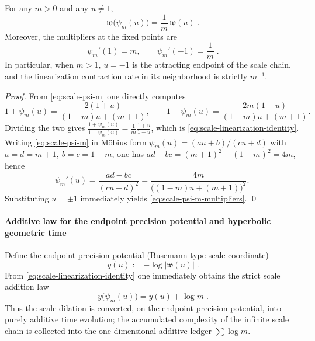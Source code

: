 \begin{proposition}\label{prop:scale-linearization-identity-multipliers}
For any \(m>0\) and any \(u\neq 1\),
\begin{equation}\label{eq:scale-linearization-identity}
\boxed{\;\mathfrak{w}\!\bigl(\psi_m(u)\bigr)=\frac{1}{m}\,\mathfrak{w}(u)\; }.
\end{equation}
Moreover, the multipliers at the fixed points are
\begin{equation}\label{eq:scale-psi-m-multipliers}
\boxed{\;\psi_m'(1)=m,\qquad \psi_m'(-1)=\frac{1}{m}\; }.
\end{equation}
In particular, when \(m>1\), \(u=-1\) is the attracting endpoint of the scale chain, and the linearization contraction rate in its neighborhood is strictly \(m^{-1}\).
\end{proposition}
\begin{proof}
From \eqref{eq:scale-psi-m} one directly computes
\[
1+\psi_m(u)=\frac{2(1+u)}{(1-m)u+(m+1)},
\qquad
1-\psi_m(u)=\frac{2m(1-u)}{(1-m)u+(m+1)}.
\]
Dividing the two gives
\(
\frac{1+\psi_m(u)}{1-\psi_m(u)}=\frac{1}{m}\frac{1+u}{1-u}
\), which is \eqref{eq:scale-linearization-identity}.
Writing \eqref{eq:scale-psi-m} in M\"obius form \(\psi_m(u)=(au+b)/(cu+d)\) with
\(
a=d=m+1,\ b=c=1-m
\), one has \(ad-bc=(m+1)^2-(1-m)^2=4m\), hence
\[
\psi_m'(u)=\frac{ad-bc}{(cu+d)^2}=\frac{4m}{\bigl((1-m)u+(m+1)\bigr)^2}.
\]
Substituting \(u=\pm 1\) immediately yields \eqref{eq:scale-psi-m-multipliers}. \qed
\end{proof}

\paragraph{Additive law for the endpoint precision potential and hyperbolic geometric time}
Define the endpoint precision potential (Busemann-type scale coordinate)
\begin{equation}\label{eq:endpoint-busemann-potential}
\boxed{\;y(u):=-\log|\mathfrak{w}(u)|\; }.
\end{equation}
From \eqref{eq:scale-linearization-identity} one immediately obtains the strict scale addition law
\begin{equation}\label{eq:endpoint-busemann-addition-law}
\boxed{\;y\!\bigl(\psi_m(u)\bigr)=y(u)+\log m\; }.
\end{equation}
Thus the scale dilation is converted, on the endpoint precision potential, into purely additive time evolution; the accumulated complexity of the infinite scale chain is collected into the one-dimensional additive ledger \(\sum\log m\).


